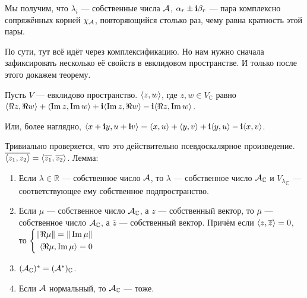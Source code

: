 \documentclass{article}
\let\complexIm\Im
\DeclareMathOperator{\operIm}{Im}
\let\Im\operIm
\begin{document}
\begin{itemize}
        \begin{Comment}
            Мы получим, что $\lambda_i$ --- собственные числа ${\mathcal{A}}$, $\alpha_r\pm{\mathbf i}\beta_r$ --- пара комплексно сопряжённых корней $\chi_{{\mathcal{A}}}$, повторяющийся столько раз, чему равна кратность этой пары.
        \end{Comment}
        \begin{Comment}
            По сути, тут всё идёт через комплексификацию. Но нам нужно сначала зафиксировать несколько её свойств в евклидовом пространстве. И только после этого докажем теорему.
        \end{Comment}
        \dfn Пусть $V$ --- евклидово пространство.  ${\left\langle{z},{w}\right\rangle}$, где $z,w\in V_{\mathbb C}$ равно $\dotprod{\Re z}{\Re w}+\dotprod{\complexIm z}{\complexIm w}+\im\dotprod{\complexIm z}{\Re w}-\im\dotprod{\Re z}{\complexIm w}$.
        \begin{Comment}
            Или, более наглядно, ${\left\langle{x+{\mathbf i}y},{u+{\mathbf i} v}\right\rangle}={\left\langle{x},{u}\right\rangle}+{\left\langle{y},{v}\right\rangle}+{\mathbf i}{\left\langle{y},{u}\right\rangle}-{\mathbf i}{\left\langle{x},{v}\right\rangle}$.
        \end{Comment}
        \thm Тривиально проверяется, что это действительно псевдоскалярное произведение.
        \thm $\overline{{\left\langle{z_1},{z_2}\right\rangle}}={\left\langle{\overline{z_1}},{\overline{z_2}}\right\rangle}$.
        \thm Лемма:
        \begin{enumerate}
            \item Если $\lambda\in\mathbb R$ --- собственное число ${\mathcal{A}}$, то $\lambda$ --- собственное число ${\mathcal{A}}_{\mathbb C}$ и ${V_\lambda}_{\mathbb C}$ --- соответствующее ему собственное подпространство.
            \item Если $\mu$ --- собственное число ${\mathcal{A}}_{\mathbb C}$, а $z$ --- собственный вектор, то $\overline\mu$ --- собственное число ${\mathcal{A}}_{\mathbb C}$, а $\overline z$ --- собственный вектор. Причём если ${\left\langle{z},{\overline z}\right\rangle}=0$, то $\left\{\begin{aligned}
                \|\Re\mu\|=\|\complexIm\mu\|\\
                \dotprod{\Re\mu}{\complexIm\mu}=0
            \end{aligned}\right.$
            \item $({\mathcal{A}}_{\mathbb C})^*=({\mathcal{A}}^*)_{\mathbb C}$.
            \item Если ${\mathcal{A}}$ нормальный, то ${\mathcal{A}}_{\mathbb C}$ --- тоже.
        \end{enumerate}
        \begin{Proof}

\end{Proof}
\end{itemize}
\end{document}
